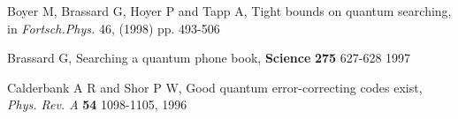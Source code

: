 \documentclass{article}
\begin{document}
\begin{thebibliography}{12}
Boyer M, Brassard G, Hoyer P and Tapp A,
Tight bounds on quantum searching,
in {\it Fortsch.Phys.} 46, (1998) pp. 493-506 


Brassard G,
Searching a quantum phone book, 
{\bf Science} {\bf 275} 627-628 1997

% 
% 
% 
% 
% 
% 
% 
% 
% 
% 
% 
% 
% 
% 
% 
% 
% 
% 
% 


Calderbank A R and Shor P W,
Good quantum error-correcting codes exist, 
{\em Phys. Rev. A} {\bf 54} 1098-1105,  1996



\end{thebibliography}
\end{document}
